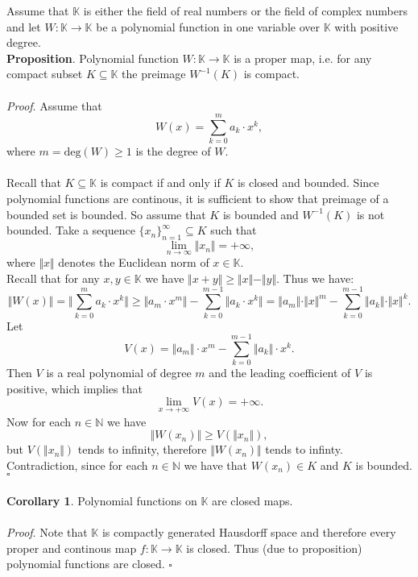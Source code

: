 \documentclass[12pt]{article}
\begin{document}
Assume that $\mathbb{K}$ is either the field of real numbers or the field of complex numbers and let $W:\mathbb{K}\to\mathbb{K}$ be a polynomial function in one variable over $\mathbb{K}$ with positive degree.\\

\textbf{Proposition}. Polynomial function $W:\mathbb{K}\to\mathbb{K}$ is a proper map, i.e. for any compact subset $K\subseteq\mathbb{K}$ the preimage $W^{-1}(K)$ is compact.\\ \\
\textit{Proof}. Assume that 
$$W(x)=\sum_{k=0}^{m} a_k\cdot x^k,$$
where $m=\mathrm{deg}(W)\geq 1$ is the degree of $W$.\\ \\
Recall that $K\subseteq\mathbb{K}$ is compact if and only if $K$ is closed and bounded. Since polynomial functions are continous, it is sufficient to show that preimage of a bounded set is bounded. So assume that $K$ is bounded and $W^{-1}(K)$ is not bounded. Take a sequence $\{x_{n}\}_{n=1}^{\infty}\subseteq K$ such that 
$$\lim_{n\to\infty} \Vert x_n \Vert = +\infty,$$
where $\Vert x \Vert$ denotes the Euclidean norm of $x\in\mathbb{K}$.\\
\indent Recall that for any $x,y\in\mathbb{K}$ we have $\Vert x+y\Vert\geq \Vert x\Vert - \Vert y\Vert$. Thus we have:
$$\Vert W(x)\Vert=\Vert\sum_{k=0}^{m} a_k\cdot x^k\Vert\geq\Vert a_m\cdot x^m\Vert - \sum_{k=0}^{m-1} \Vert a_k\cdot x^k\Vert=\Vert a_m\Vert\cdot \Vert x\Vert^m - \sum_{k=0}^{m-1} \Vert a_k\Vert\cdot \Vert x\Vert^k.$$
Let $$V(x)=\Vert a_m\Vert\cdot x^m - \sum_{k=0}^{m-1} \Vert a_k\Vert\cdot x^k.$$
Then $V$ is a real polynomial of degree $m$ and the leading coefficient of $V$ is positive, which implies that
$$\lim_{x\to +\infty} V(x)=+\infty.$$
Now for each $n\in\mathbb{N}$ we have
$$\Vert W(x_n)\Vert \geq V(\Vert x_n\Vert),$$
but $V(\Vert x_n\Vert)$ tends to infinity, therefore $\Vert W(x_n)\Vert$ tends to infinty. Contradiction, since for each $n\in\mathbb{N}$ we have that $W(x_n)\in K$ and $K$ is bounded. $\square$ \\ \\
\textbf{Corollary 1}. Polynomial functions on $\mathbb{K}$ are closed maps.\\ \\
\textit{Proof}. Note that $\mathbb{K}$ is compactly generated Hausdorff space and therefore every proper and continous map $f:\mathbb{K}\to\mathbb{K}$ is closed. Thus (due to proposition) polynomial functions are closed. $\square$\\ \\
\end{document}
